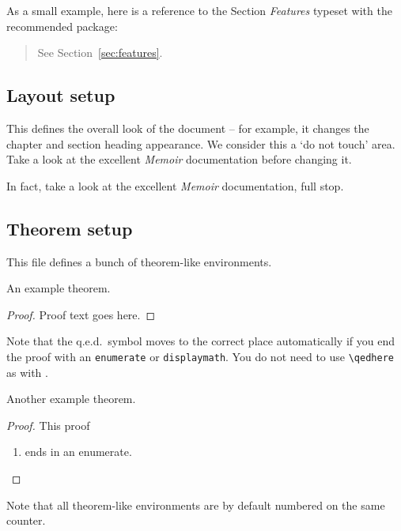 As a small example, here is a reference to the Section \emph{Features}
typeset with the recommended  package:
\begin{quote}
  See Section~\vref{sec:features}.
\end{quote}


\subsection{Layout setup}

This defines the overall look of the document -- for example, it
changes the chapter and section heading appearance.  We consider this
a `do not touch' area.  Take a look at the excellent \emph{Memoir}
documentation before changing it.

In fact, take a look at the excellent \emph{Memoir} documentation,
full stop.


\subsection{Theorem setup}

This file defines a bunch of theorem-like environments.

\begin{theorem}
  An example theorem.
\end{theorem}

\begin{proof}
  Proof text goes here.
\end{proof}

Note that the q.e.d.\ symbol moves to the correct place automatically
if you end the proof with an \texttt{enumerate} or
\texttt{displaymath}.  You do not need to use \verb-\qedhere- as with
.

\begin{theorem}
  Another example theorem.
\end{theorem}

\begin{proof}
  This proof
  \begin{enumerate}
  \item ends in an enumerate.
  \end{enumerate}
\end{proof}

\begin{proposition}
  Note that all theorem-like environments are by default numbered on
  the same counter.
\end{proposition}

